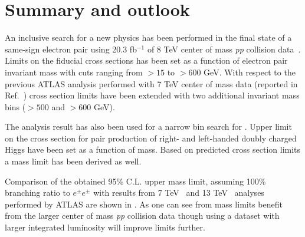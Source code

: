 \section{Summary and outlook}
\label{sec:ssOutlook}

An inclusive search for a new physics has been performed in the final state of a same-sign electron pair using 20.3 fb$^{-1}$ of 8 TeV center of mass \textit{pp} collision data~\cite{ss_8TeV}. Limits on the fiducial cross sections has been set as a function of electron pair invariant mass with cuts ranging from $>15$ to $>600$ GeV.
With respect to the previous ATLAS analysis performed with 7 TeV center of mass data (reported in Ref.~\cite{ss_7TeV}) cross section limits have been 
extended with two additional invariant mass bins ($>500$ and $>600$ GeV).

The analysis result has also been used for a narrow bin search for \dch.
Upper limit on the cross section for pair production of right- and left-handed doubly charged Higgs have been set as a function of \dch mass.
Based on predicted cross section limits a mass limit has been derived as well.

Comparison of the obtained 95\% C.L. upper \dch mass limit, assuming 100\% branching ratio to $e^{\pm}e^{\pm}$ with results from 7 TeV~\cite{dch_7TeV_paper} and 13 TeV~\cite{dch_13TeV_conf} analyses performed by ATLAS are shown in .
As one can see from  mass limits benefit from the larger center of mass \textit{pp} collision data though using a dataset with larger integrated luminosity will improve limits further.

